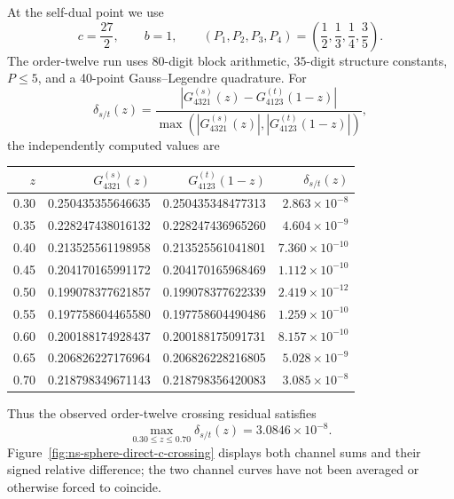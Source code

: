 \documentclass[11pt]{article}
\begin{document}
At the self-dual point we use
\begin{equation}
 c=\frac{27}{2},\qquad b=1,\qquad
 (P_1,P_2,P_3,P_4)
 =\left(\frac12,\frac13,\frac14,\frac35\right).
 \label{eq:ns-crossing-numerical-point}
\end{equation}
The order-twelve run uses \(80\)-digit block arithmetic, \(35\)-digit
structure constants, \(P\leq5\), and a 40-point Gauss--Legendre quadrature.
For
\begin{equation}
 \delta_{s/t}(z)=
 \frac{\left|G_{4321}^{(s)}(z)-G_{4123}^{(t)}(1-z)\right|}
 {\max\!\left(\left|G_{4321}^{(s)}(z)\right|,
              \left|G_{4123}^{(t)}(1-z)\right|\right)},
 \label{eq:ns-crossing-relative-residual}
\end{equation}
the independently computed values are
\begin{center}
\scriptsize
\begin{tabular}{@{}rrrr@{}}
\toprule
\(z\) & \(G_{4321}^{(s)}(z)\) & \(G_{4123}^{(t)}(1-z)\)
      & \(\delta_{s/t}(z)\)\\
\midrule
0.30 & 0.250435355646635 & 0.250435348477313 & \(2.863\times10^{-8}\)\\
0.35 & 0.228247438016132 & 0.228247436965260 & \(4.604\times10^{-9}\)\\
0.40 & 0.213525561198958 & 0.213525561041801 & \(7.360\times10^{-10}\)\\
0.45 & 0.204170165991172 & 0.204170165968469 & \(1.112\times10^{-10}\)\\
0.50 & 0.199078377621857 & 0.199078377622339 & \(2.419\times10^{-12}\)\\
0.55 & 0.197758604465580 & 0.197758604490486 & \(1.259\times10^{-10}\)\\
0.60 & 0.200188174928437 & 0.200188175091731 & \(8.157\times10^{-10}\)\\
0.65 & 0.206826227176964 & 0.206826228216805 & \(5.028\times10^{-9}\)\\
0.70 & 0.218798349671143 & 0.218798356420083 & \(3.085\times10^{-8}\)\\
\bottomrule
\end{tabular}
\end{center}
Thus the observed order-twelve crossing residual satisfies
\begin{equation}
 \max_{0.30\leq z\leq0.70}\delta_{s/t}(z)
 =3.0846\times10^{-8}.
 \label{eq:ns-crossing-order12-result}
\end{equation}
Figure~\ref{fig:ns-sphere-direct-c-crossing} displays both channel sums and
their signed relative difference; the two channel curves have not been
averaged or otherwise forced to coincide.
\end{document}
